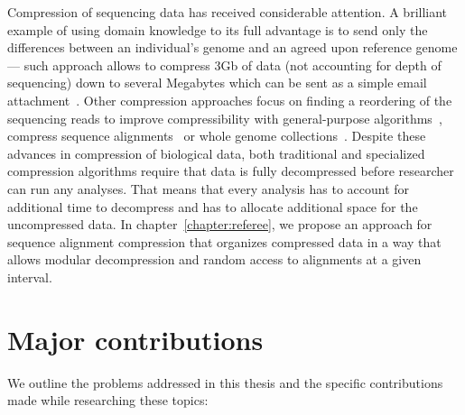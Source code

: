 Compression of sequencing data has received considerable attention. A brilliant example of using domain knowledge to its full advantage is to send only the differences between an individual's genome and an agreed upon reference genome --- such approach allows to compress 3Gb of data (not accounting for depth of sequencing) down to several Megabytes which can be sent as a simple email attachment~\cite{Christley2009,Ruths2013}. Other compression approaches focus on finding a reordering of the sequencing reads to improve compressibility with general-purpose algorithms~\cite{Sahinalp2012,Mince,PathEncode,Jones2012}, compress sequence alignments~\cite{SamTools,CRAM,Sahinalp2015} or whole genome collections~\cite{Deorowicz2013}. Despite these advances in compression of biological data, both traditional and specialized compression algorithms require that data is fully decompressed before researcher can run any analyses. That means that every analysis has to account for additional time to decompress and has to allocate additional space for the uncompressed data. In chapter~\ref{chapter:referee}, we propose an approach for sequence alignment compression that organizes compressed data in a way that allows modular decompression and random access to alignments at a given interval.



\section{Major contributions}

We outline the problems addressed in this thesis and the specific contributions made while researching these topics:

